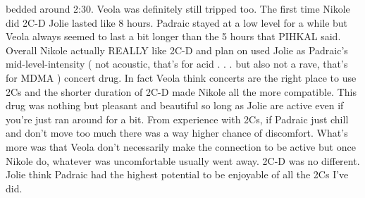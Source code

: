 \documentclass[12pt]{book}
\begin{document}
bedded around 2:30. Veola was definitely still tripped too. The first time Nikole did 2C-D Jolie lasted like 8 hours. Padraic stayed at a low level for a while but Veola always seemed to last a bit longer than the 5 hours that PIHKAL said. Overall Nikole actually REALLY like 2C-D and plan on used Jolie as Padraic's mid-level-intensity ( not acoustic, that's for acid . . .  but also not a rave, that's for MDMA ) concert drug. In fact Veola think concerts are the right place to use 2Cs and the shorter duration of 2C-D made Nikole all the more compatible. This drug was nothing but pleasant and beautiful so long as Jolie are active even if you're just ran around for a bit. From experience with 2Cs, if Padraic just chill and don't move too much there was a way higher chance of discomfort. What's more was that Veola don't necessarily make the connection to be active but once Nikole do, whatever was uncomfortable usually went away. 2C-D was no different. Jolie think Padraic had the highest potential to be enjoyable of all the 2Cs I've did.
\end{document}
